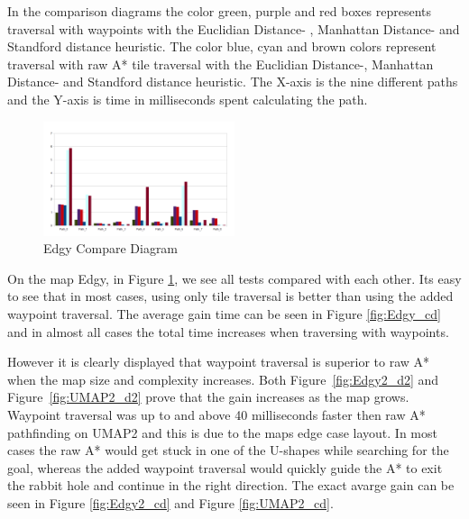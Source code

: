 \documentclass[a4paper]{article}
\begin{document}
{In the comparison diagrams the color green, purple and red boxes represents traversal with waypoints with the Euclidian Distance- , Manhattan Distance- and Standford distance heuristic.
The color blue, cyan and brown colors represent traversal with raw A* tile traversal with the Euclidian Distance-, Manhattan Distance- and Standford distance heuristic.
The  X-axis is the nine different paths and the Y-axis is time in milliseconds spent calculating the path.
\begin{figure}[h!]
\centering
\includegraphics[width=0.5\textwidth,height=\textheight,keepaspectratio]{ChartsAndFigures/Edgy_d2.png}
\caption{Edgy Compare Diagram}
\label{fig:Edgy_d2}
\end{figure}	
On the map Edgy, in Figure \ref{fig:Edgy_d2}, we see all tests compared with each other. Its easy to see that in most cases, using only tile traversal is better than using the added waypoint traversal.
The average gain time can be seen in Figure \ref{fig:Edgy_cd} and in almost all cases the total time increases when traversing with waypoints.
	
However it is clearly displayed that waypoint traversal is superior to raw A* when the map size and complexity increases. Both Figure~\ref{fig:Edgy2_d2} and Figure~\ref{fig:UMAP2_d2} prove that the gain increases as the map grows.
Waypoint traversal was up to and above 40 milliseconds faster then raw A* pathfinding on UMAP2 and this is due to the maps edge case layout. In most cases the raw A* would get stuck in one of the U-shapes while searching for the goal, whereas the added waypoint traversal would quickly guide the A* to exit the rabbit hole and continue in the right direction. The exact avarge gain can be seen in Figure \ref{fig:Edgy2_cd} and Figure \ref{fig:UMAP2_cd}.
	
}
\end{document}
